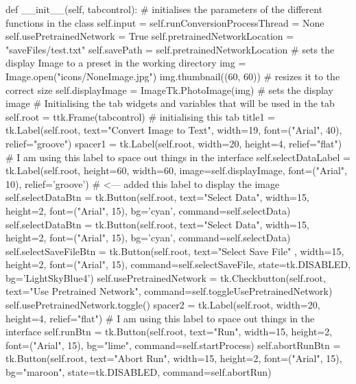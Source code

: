 \documentclass{report}
\begin{document}
\begin{python}
    def __init__(self, tabcontrol):
        # initialises the parameters of the different functions in the class
        self.input = self.runConversionProcessThread = None
        self.usePretrainedNetwork = True
        self.pretrainedNetworkLocation = "saveFiles/test.txt"
        self.savePath = self.pretrainedNetworkLocation
        # sets the display Image to a preset in the working directory
        img = Image.open("icons/NoneImage.jpg")
        img.thumbnail((60, 60))  # resizes it to the correct size
        self.displayImage = ImageTk.PhotoImage(img)  # sets the display image
        # Initialising the tab widgets and variables that will be used in the tab
        self.root = ttk.Frame(tabcontrol)  # initialising this tab
        title1 = tk.Label(self.root, text="Convert Image to Text", width=19,
                            font=("Arial", 40), relief="groove")
        spacer1 = tk.Label(self.root, width=20, height=4,
                            relief="flat")  # I am using this label to space out things in the interface
        self.selectDataLabel = tk.Label(self.root, height=60, width=60,
                            image=self.displayImage, font=("Arial", 10),
                            relief='groove')  # <--- added this label to display the image
        self.selectDataBtn = tk.Button(self.root, text="Select Data",
                            width=15, height=2, font=("Arial", 15),
                            bg='cyan', command=self.selectData)
        self.selectDataBtn = tk.Button(self.root, text="Select Data",
                            width=15, height=2, font=("Arial", 15),
                            bg='cyan', command=self.selectData)
        self.selectSaveFileBtn = tk.Button(self.root, text="Select Save File"
                                , width=15, height=2, font=("Arial", 15),
                                command=self.selectSaveFile,
                                state=tk.DISABLED, bg='LightSkyBlue4')
        self.usePretrainedNetwork = tk.Checkbutton(self.root,
                        text="Use Pretrained Network",
                        command=self.toggleUsePretrainedNetwork)
        self.usePretrainedNetwork.toggle()
        spacer2 = tk.Label(self.root, width=20, height=4,
                           relief="flat")  # I am using this label to space out things in the interface
        self.runBtn = tk.Button(self.root, text="Run", width=15, height=2,
                                font=("Arial", 15), bg="lime",
                                command=self.startProcess)
        self.abortRunBtn = tk.Button(self.root, text="Abort Run", width=15,
                                height=2, font=("Arial", 15),
                                bg="maroon", state=tk.DISABLED,
                                command=self.abortRun)


\end{python}
\end{document}
